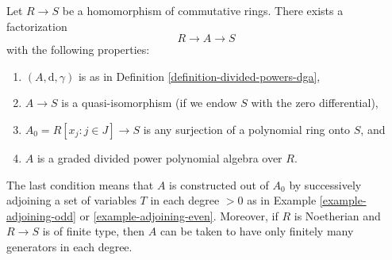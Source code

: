 \begin{lemma}
\label{lemma-tate-resolution}
Let $R \to S$ be a homomorphism of commutative rings.
There exists a factorization
$$
R \to A \to S
$$
with the following properties:
\begin{enumerate}
\item $(A, \text{d}, \gamma)$ is as in
Definition \ref{definition-divided-powers-dga},
\item $A \to S$ is a quasi-isomorphism (if we endow $S$ with
the zero differential),
\item $A_0 = R[x_j: j\in J] \to S$ is any surjection of a polynomial
ring onto $S$, and
\item $A$ is a graded divided power polynomial algebra over $R$.
\end{enumerate}
The last condition means that $A$ is constructed out of $A_0$ by
successively adjoining a set of variables $T$ in each degree $> 0$ as in
Example \ref{example-adjoining-odd} or \ref{example-adjoining-even}.
Moreover, if $R$ is Noetherian and $R\to S$ is of finite type,
then $A$ can be taken to have only finitely many generators in
each degree.
\end{lemma}

